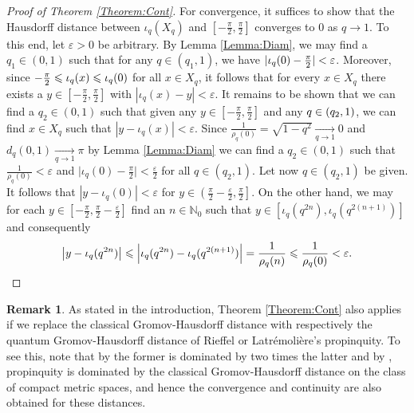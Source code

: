 \documentclass[11pt, reqno, a4paper, final]{amsart}
\theoremstyle{plain}
\theoremstyle{definition}
\newtheorem{remark}[thm]{Remark}
\newcommand{\NN}{{\mathbb N}}
\newcommand{\To}{\longrightarrow}
\renewcommand{\leq}{\leqslant}
\newcommand{\black}{\color{black}}
\renewcommand{\epsilon}{{\varepsilon}}
\begin{document}
\begin{proof}[Proof of Theorem \ref{Theorem:Cont}]
For convergence, it suffices to show that the Hausdorff distance between {\black $\iota_q(X_q)$} and $\left[-\tfrac{\pi}{2},\tfrac{\pi}{2}\right]$ converges to $0$ as $q\to 1$. To this end, let $\epsilon>0$ be arbitrary. By Lemma \ref{Lemma:Diam}, we may find a $q_1\in (0,1)$ such that for any $q\in (q_1,1)$, we have $|{\black \iota_q(0)}-\tfrac{\pi}{2}|<\epsilon$. {\black Moreover,} since $-\frac{\pi}{2}\leq {\black \iota_q(x)}\leq {\black \iota_q(0)}$ for all $x\in X_q$, it follows that for every $x\in X_q$ there exists a $y\in  \left[-\tfrac{\pi}{2},\tfrac{\pi}{2}\right]$ with $|\iota_q(x)-y|<\epsilon$. 
It remains to be shown that we can find a $q_2\in (0,1)$ such that given any $y\in \left[-\tfrac{\pi}{2},\tfrac{\pi}{2}\right]$ and any $q\in {\black (q_2,1)}$, we can find $x\in X_q$ such that $|y-\iota_q(x)|<\epsilon$. Since $\frac{1}{\rho_q(0)}=\sqrt{1-q^2} \underset{q\to 1}{\To} 0$ and $d_q(0,1) \underset{q\to 1}{\To} \pi$ by Lemma \ref{Lemma:Diam}
we can find a {\black $q_2 \in (0,1)$} such that $\frac{1}{\rho_q(0)}<\epsilon$ and $\vert \iota_q(0)-\tfrac{\pi}{2}\vert <\tfrac{\epsilon}{2}$ for all $q\in(q_2,1)$. {\black Let now $q \in (q_2,1)$ be given.} It follows that $|y-\iota_q(0)|<\epsilon$ for $y\in \left(\tfrac{\pi}{2}-\tfrac{\epsilon}{2},\tfrac{\pi}{2}\right]$. On the other hand, we may for each $y\in \left[-\tfrac{\pi}{2},\tfrac{\pi}{2}-\tfrac{\epsilon}{2}\right]$ find an $n\in \NN_0$ such that $y\in [\iota_q(q^{2n}),\iota_q(q^{2(n+1)})]$ and consequently 
\[
\left|y-\iota_q(q^{2n})\right| \leq \left|\iota_q(q^{2n})-\iota_q(q^{2(n+1)})\right| = \frac{1}{\rho_q(n)}\leq \frac{1}{\rho_q(0)}<\epsilon . \qedhere
\]
\end{proof}
\begin{remark}
\label{Rem:Dist}
As stated in the introduction, Theorem \ref{Theorem:Cont} also applies if we replace the classical Gromov-Hausdorff distance with respectively the quantum Gromov-Hausdorff distance of Rieffel \cite{Rieffel-distance} or Latrémolière's propinquity. To see this, note that by \cite[Corollary 6.4]{Latremoliere} the former is dominated by two times the latter and by \cite[Theorem 6.6]{Latremoliere}, propinquity is dominated by the classical Gromov-Hausdorff distance on the class of compact metric spaces, and hence the convergence and continuity are also obtained for these distances. 
\end{remark}
%
%
\def\cprime{$'$} \def\cprime{$'$}
\end{document}
